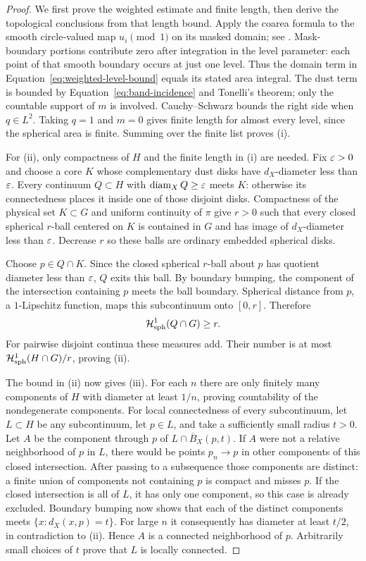 \begin{proof}
We first prove the weighted estimate and finite length, then derive
the topological conclusions from that length bound.
Apply the coarea formula to the smooth circle-valued map
$u_i\pmod1$ on its masked domain; see \cite{Federer1969}.
Mask-boundary portions contribute zero after integration in the level
parameter: each point of that smooth boundary occurs at just one
level.  Thus the domain term in
Equation~\eqref{eq:weighted-level-bound} equals its stated area
integral.  The dust term is bounded by
Equation~\eqref{eq:band-incidence} and Tonelli's theorem; only the
countable support of $m$ is involved.  Cauchy--Schwarz bounds the
right side when $q\in L^2$.  Taking $q=1$ and $m=0$ gives finite
length for almost every level, since the spherical area is finite.
Summing over the finite list proves \textup{(i)}.

For \textup{(ii)}, only compactness of $H$ and the finite length in
\textup{(i)} are needed.  Fix $\varepsilon>0$ and choose a core $K$ whose
complementary dust disks have
$d_X$-diameter less than $\varepsilon$.  Every continuum $Q\subset H$ with
$\operatorname{diam}_X Q\ge\varepsilon$ meets $K$: otherwise its connectedness places it
inside one of those disjoint disks.  Compactness of the physical set
$K\subset G$ and uniform continuity of $\pi$ give $r>0$ such that
every closed spherical $r$-ball centered on $K$ is contained in $G$
and has image of $d_X$-diameter less than $\varepsilon$.  Decrease $r$ so
these balls are ordinary embedded spherical disks.

Choose $p\in Q\cap K$.  Since the closed spherical $r$-ball about
$p$ has quotient diameter less than $\varepsilon$, $Q$ exits this ball.
By boundary bumping, the component of the intersection containing
$p$ meets the ball boundary.  Spherical distance from $p$, a
$1$-Lipschitz function, maps this subcontinuum onto $[0,r]$.  Therefore
\[
 \mathcal H^1_{\mathrm{sph}}(Q\cap G)\ge r.
\]
For pairwise disjoint continua these measures add.  Their number is
at most $\mathcal H^1_{\mathrm{sph}}(H\cap G)/r$, proving \textup{(ii)}.

The bound in \textup{(ii)} now gives \textup{(iii)}.
For each $n$ there are only finitely many components
of $H$ with diameter at least $1/n$, proving countability of the
nondegenerate components.  For local connectedness of every
subcontinuum, let $L\subset H$ be any subcontinuum, let
$p\in L$, and take a sufficiently small radius $t>0$.  Let $A$ be
the component through $p$ of $L\cap\overline B_X(p,t)$.  If $A$
were not a relative neighborhood of $p$ in $L$, there would be points
$p_n\to p$ in other components of this closed intersection.  After
passing to a subsequence those components are distinct: a finite
union of components not containing $p$ is compact and misses $p$.
If the closed intersection is all of $L$, it has only one component,
so this case is already excluded.  Boundary bumping now shows that
each of the distinct components meets $\{x:d_X(x,p)=t\}$.  For large
$n$ it consequently has diameter at least $t/2$, in contradiction to
\textup{(ii)}.  Hence $A$ is a connected neighborhood of $p$.
Arbitrarily small choices of $t$ prove that $L$ is locally connected.


\end{proof}
